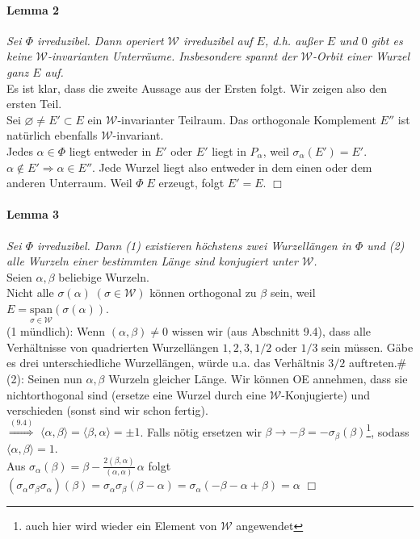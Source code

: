 \documentclass[a4paper,12pt]{article}
\begin{document}
\paragraph{Lemma 2} \emph{Sei $\Phi$ irreduzibel. Dann operiert $\mathcal{W}$ irreduzibel auf $E$, d.h. außer $E$ und ${0}$ gibt es keine $\mathcal{W}$-invarianten Unterräume. Insbesondere spannt der $\mathcal{W}$-Orbit einer Wurzel ganz $E$ auf.} \\
Es ist klar, dass die zweite Aussage aus der Ersten folgt. Wir zeigen also den ersten Teil.\\
Sei $\varnothing \neq E' \subset E$ ein $\mathcal{W}$-invarianter Teilraum. Das orthogonale Komplement $E''$ ist natürlich ebenfalls $\mathcal{W}$-invariant.\\
Jedes $\alpha\in\Phi$ liegt entweder in $E'$ oder $E'$ liegt in $P_\alpha$, weil $\sigma_\alpha (E')=E'$.\\
$\alpha \notin E' \Rightarrow \alpha \in E'' $. Jede Wurzel liegt also entweder in dem einen oder dem anderen Unterraum. Weil $\Phi\; E$ erzeugt, folgt $E'=E$.
\hfill$\Box$ 

\paragraph{Lemma 3} \emph{Sei $\Phi$ irreduzibel. Dann (1) existieren höchstens zwei Wurzellängen in $\Phi$ und (2) alle Wurzeln einer bestimmten Länge sind konjugiert unter $\mathcal{W}$.}\\
Seien $\alpha,\beta$ beliebige Wurzeln.\\
Nicht alle $\sigma(\alpha)\; (\sigma \in\mathcal{W})$ können orthogonal zu $\beta$ sein, weil $E=\underset{\sigma\in\mathcal{W}}{\text{span}}(\sigma(\alpha))$.\\
(1 mündlich): Wenn $(\alpha,\beta)\neq 0$ wissen wir (aus Abschnitt 9.4), dass alle Verhältnisse von quadrierten Wurzellängen $1,2,3,1/2$ oder $1/3$ sein müssen. Gäbe es drei unterschiedliche Wurzellängen, würde u.a. das Verhältnis $3/2$ auftreten.\hfill \#\\
(2): Seinen nun $\alpha, \beta$ Wurzeln gleicher Länge. Wir können OE annehmen, dass sie nichtorthogonal sind (ersetze eine Wurzel durch eine $\mathcal{W}$-Konjugierte) und verschieden (sonst sind wir schon fertig).\\
$\overset{(9.4)}{\Rightarrow}$ $\langle\alpha,\beta\rangle = \langle\beta,\alpha\rangle=\pm 1$. Falls nötig ersetzen wir $\beta \rightarrow -\beta = -\sigma_\beta(\beta)$\footnote{auch hier wird wieder ein Element von $\mathcal{W} $ angewendet}, sodass $\langle\alpha,\beta\rangle = 1$.\\
Aus $\sigma_\alpha(\beta) = \beta - \frac{2(\beta,\alpha)}{(\alpha,\alpha)}\,\alpha$ folgt $(\sigma_\alpha \sigma_\beta \sigma_\alpha)(\beta)= \sigma_\alpha \sigma_\beta (\beta-\alpha) = \sigma_\alpha (- \beta-\alpha+\beta) = \alpha$
\hfill$\Box$
\end{document}
